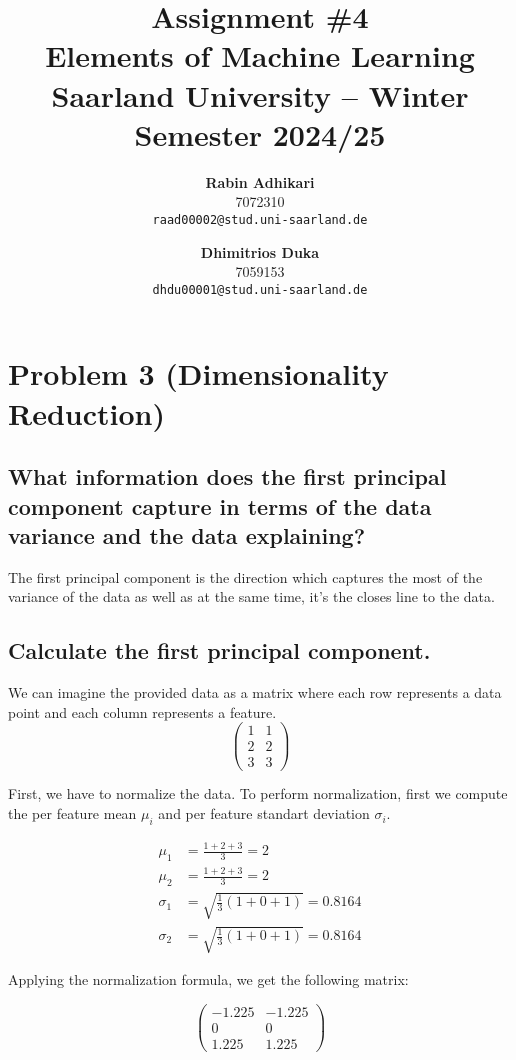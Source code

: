 \documentclass{article}
\title{Assignment \#4\\
  \vspace{2mm}
  \small{Elements of Machine Learning}
  \\
  \vspace{2mm}
  \small{Saarland University -- Winter Semester 2024/25}
}
\author{%
\textbf{Rabin Adhikari} \\
  7072310 \\
  \texttt{raad00002@stud.uni-saarland.de} \\
  \and
  \textbf{Dhimitrios Duka} \\
 7059153 \\
  \texttt{dhdu00001@stud.uni-saarland.de} \\
}
\begin{document}
\maketitle


\setcounter{section}{2}
\section{Problem 3 (Dimensionality Reduction)}
\subsection{What information does the first principal component capture in terms of the data variance and the
data explaining?}

The first principal component is the direction which captures the most of the variance of the data as well as at the same time, it's the closes line to the data.

\subsection{Calculate the first principal component.}
We can imagine the provided data as a matrix where each row represents a data point and each column represents a feature.
\[
    \begin{pmatrix}
        1 & 1 \\
        2 & 2 \\
        3 & 3
    \end{pmatrix}
\]

First, we have to normalize the data. To perform normalization, first we compute the per feature mean $\mu_i$ and per feature standart deviation $\sigma_i$.

\begin{equation}
    \begin{aligned}
        \mu_1 &= \frac{1 + 2 + 3}{3} = 2 \\
        \mu_2 &= \frac{1 + 2 + 3}{3} = 2 \\
        \sigma_1 &= \sqrt{\frac{1}{3} (1 + 0 + 1)} = 0.8164 \\
        \sigma_2 &= \sqrt{\frac{1}{3} (1 + 0 + 1)} = 0.8164
    \end{aligned}
\end{equation}

Applying the normalization formula, we get the following matrix:

\[
    \begin{pmatrix}
        -1.225 & -1.225 \\
        0 & 0 \\
        1.225 & 1.225
    \end{pmatrix}
\]
\end{document}
